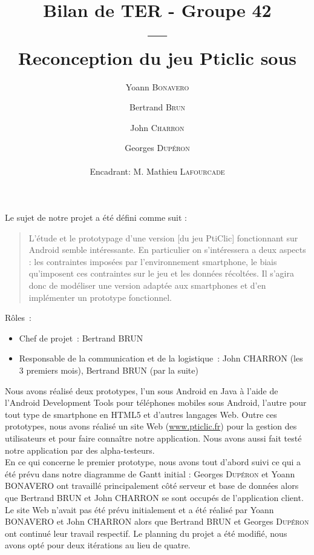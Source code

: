 \documentclass[a4paper,11pt,french]{article}
\title{Bilan de TER - Groupe 42\\---\\Reconception du jeu Pticlic sous \android{}}
\author{Yoann \textsc{Bonavero} \and Bertrand \textsc{Brun} \and John \textsc{Charron} \and Georges \textsc{Dupéron} \\\\ Encadrant: M. Mathieu \textsc{Lafourcade}}
\def\android{Android\texttrademark}
\begin{document}

\maketitle
\noindent Le sujet de notre projet a été défini comme suit : 

\begin{quotation}
\noindent L'étude et le prototypage d'une version [du jeu PtiClic] fonctionnant sur \android{} semble intéressante. En particulier on s'intéressera a deux aspects : les contraintes imposées par l'environnement smartphone, le biais qu'imposent ces contraintes sur le jeu et les données récoltées. Il s'agira donc de modéliser une version adaptée aux smartphones et d'en implémenter un prototype fonctionnel. \\
\end{quotation}

\noindent Rôles~:
\begin{itemize}
\item Chef de projet~: Bertrand \textsc{BRUN}
\item Responsable de la communication et de la logistique~: John \textsc{CHARRON} (les 3 premiers mois), Bertrand \textsc{BRUN} (par la suite) \\
\end{itemize}

\noindent Nous avons réalisé deux prototypes, l'un sous \android{} en Java à l'aide de l'Android Development Tools pour téléphones mobiles sous \android{}, l'autre pour tout type de smartphone en HTML5 et d'autres langages Web. Outre ces prototypes, nous avons réalisé un site Web (\url{www.pticlic.fr}) pour la gestion des utilisateurs et pour faire connaître notre application. Nous avons aussi fait testé notre application par des alpha-testeurs.
\\

\noindent En ce qui concerne le premier prototype, nous avons tout d'abord suivi ce qui a été prévu dans notre diagramme de Gantt initial : Georges \textsc{Dupéron} et Yoann \textsc{BONAVERO} ont travaillé principalement côté serveur et base de données alors que Bertrand \textsc{BRUN} et John \textsc{CHARRON} se sont occupés de l'application client. Le site Web n'avait pas été prévu initialement et a été réalisé par Yoann \textsc{BONAVERO} et John \textsc{CHARRON} alors que Bertrand \textsc{BRUN} et Georges \textsc{Dupéron} ont continué leur travail respectif. Le planning du projet a été modifié, nous avons opté pour deux itérations au lieu de quatre.
\\
\end{document}
